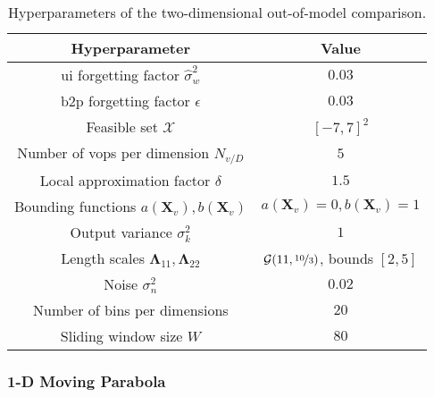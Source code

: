 \bgroup
\def\arraystretch{1}
\begin{table}[h]
    \small
    \centering
    \begin{tabular}{c||c}
        \textbf{Hyperparameter} & \textbf{Value} \\\hline\hline
        \gls{ui} forgetting factor $\hat{\sigma}_w^2$ & $0.03$\\
        \gls{b2p} forgetting factor $\epsilon$ & $0.03$\\
        Feasible set $\mathcal{X}$ & $[-7,7]^2$\\
        Number of \glspl{vop} per dimension $N_{v/D}$ & $5$\\
        Local approximation factor $\delta$ & $1.5$\\
        Bounding functions $a(\mathbf{X}_v),b(\mathbf{X}_v)$ & $a(\mathbf{X}_v)=0,b(\mathbf{X}_v)=1$\\
        Output variance $\sigma_k^2$ & $1$\\
        Length scales $\boldsymbol\Lambda_{11}, \boldsymbol\Lambda_{22}$ & $\mathcal{G}(11, \nicefrac{10}{3})$, bounds $[2, 5]$\\
        Noise $\sigma_n^2$ & $0.02$ \\
        Number of bins per dimensions & $20$ \\
        Sliding window size $W$ & $80$
    \end{tabular}
    \caption{Hyperparameters of the two-dimensional out-of-model comparison.}
    \label{tab:params_OOMC_2D}
\end{table}
\egroup

\newpage
\subsubsection{1-D Moving Parabola}

